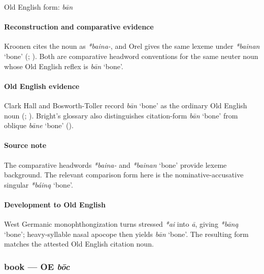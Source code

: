 \documentclass[
  british,
  a4paper,
]{article}
\providecommand{\Recon}[1]{\emph{*#1}}
\begin{document}
Old English form: \emph{bān}

\paragraph{Reconstruction and comparative
evidence}\label{reconstruction-and-comparative-evidence-6}

Kroonen cites the noun as {\emph{*baina-}}, and Orel gives the same
lexeme under \Recon{bainan} `bone' (; ). Both are comparative
headword conventions for the same neuter noun whose Old English reflex
is {\emph{bān}} `bone'.

\paragraph{Old English evidence}\label{old-english-evidence-6}

Clark Hall and Bosworth-Toller record {\emph{bān}} `bone' as the
ordinary Old English noun (; ).
Bright's glossary also distinguishes citation-form {\emph{bān}} `bone'
from oblique {\emph{bāne}} `bone'
().

\paragraph{Source note}\label{source-note-1}

The comparative headwords {\emph{*baina-}} and \Recon{bainan} `bone'
provide lexeme background. The relevant comparison form here is the
nominative-accusative singular \Recon{báiną} `bone'.

\paragraph{Development to Old
English}\label{development-to-old-english-6}

West Germanic monophthongization turns stressed \emph{*ai} into
\emph{ā}, giving \Recon{bāną} `bone'; heavy-syllable nasal apocope then
yields {\emph{bān}} `bone'. The resulting form matches the attested Old
English citation noun.

\subsubsection{\texorpdfstring{book --- OE
\emph{bōc}}{book --- OE bōc}}\label{book-oe-bux14dc}
\end{document}
